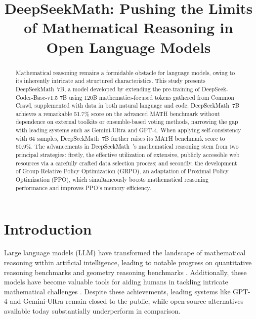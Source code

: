 \title{DeepSeekMath: Pushing the Limits of Mathematical Reasoning in Open Language Models}

\begin{abstract}
Mathematical reasoning remains a formidable obstacle for language models, owing to its inherently intricate and structured characteristics. This study presents DeepSeekMath~7B, a model developed by extending the pre-training of DeepSeek-Coder-Base-v1.5 7B using 120B mathematics-focused tokens gathered from Common Crawl, supplemented with data in both natural language and code. DeepSeekMath~7B achieves a remarkable 51.7\% score on the advanced MATH benchmark without dependence on external toolkits or ensemble-based voting methods, narrowing the gap with leading systems such as Gemini-Ultra and GPT-4. When applying self-consistency with 64 samples, DeepSeekMath~7B further raises its MATH benchmark score to 60.9\%. The advancements in DeepSeekMath~'s mathematical reasoning stem from two principal strategies: firstly, the effective utilization of extensive, publicly accessible web resources via a carefully crafted data selection process; and secondly, the development of Group Relative Policy Optimization (GRPO), an adaptation of Proximal Policy Optimization (PPO), which simultaneously boosts mathematical reasoning performance and improves PPO’s memory efficiency.
\end{abstract}

\section{Introduction}

Large language models (LLM) have transformed the landscape of mathematical reasoning within artificial intelligence, leading to notable progress on quantitative reasoning benchmarks \citep{MATH} and geometry reasoning benchmarks \citep{trinh2024solving}. Additionally, these models have become valuable tools for aiding humans in tackling intricate mathematical challenges \citep{tao}. Despite these achievements, leading systems like GPT-4 \citep{gpt4} and Gemini-Ultra \citep{gemini} remain closed to the public, while open-source alternatives available today substantially underperform in comparison.

